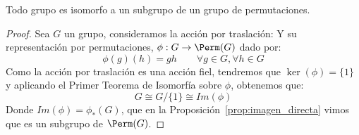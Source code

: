 \begin{teo}[Cayley] %
    Todo grupo es isomorfo a un subgrupo de un grupo de permutaciones.
    \begin{proof}
        Sea $G$ un grupo, consideramos la acción por traslación:
        Y su representación por permutaciones, $\phi:G\to \Perm(G)$ dado por:
        \begin{equation*}
            \phi(g)(h) = gh \qquad \forall g\in G, \forall h\in G
        \end{equation*}
        Como la acción por traslación es una acción fiel, tendremos que $\ker(\phi) = \{1\}$ y aplicando el Primer Teorema de Isomorfía sobre $\phi$, obtenemos que:
        \begin{equation*}
            G \cong G/\{1\} \cong Im(\phi)
        \end{equation*}
        Donde $Im(\phi) = \phi_\ast(G)$, que en la Proposición~\ref{prop:imagen_directa} vimos que es un subgrupo de $\Perm(G)$.
    \end{proof}
\end{teo}

